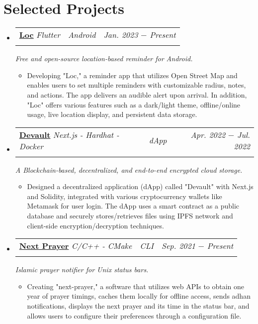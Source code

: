 \documentclass[letterpaper, 11pt]{article}
\makeatletter
\newcommand{\project}[7] {
	\vspace{-1pt}\item[]
  \begin{tabular*}{1\textwidth}[t]{ll@{\extracolsep{\fill}}r}
    #1 \href{#4}{\textbf{\color{RoyalBlue}#2}}
    \textbar{} \textit{\small#5} \textbar{ } & \textit{\footnotesize#7} & \textit{\small #3} \\
    \vspace{-8pt}
  \end{tabular*}
  \textit{\small #6}
  \vspace{-8pt}
}
\newcommand{\subproject}[1] {
\item\small
  {#1}
  \vspace{-2pt}
}
\makeatother
\begin{document}
\section{Selected Projects}
\begin{itemize}[leftmargin=0pt]
  \project
  {\faIcon{bell}}
  {Loc}{Jan. 2023 $-$ Present}
  {https://github.com/AbdeltwabMF/loc/releases/latest}{Flutter}
  {Free and open-source location-based reminder for Android.}{Android}

  \begin{itemize}
    \subproject
    {Developing "Loc," a reminder app that utilizes Open Street Map and enables users to set multiple reminders with customizable radius, notes, and actions. The app delivers an audible alert upon arrival. In addition, "Loc" offers various features such as a dark/light theme, offline/online usage, live location display, and persistent data storage.}
  \end{itemize}\vspace{-4pt}

  \project
  {\faIcon{cloud}}
  {Devault}{Apr. 2022 $-$ Jul. 2022}
  {https://devault.vercel.app/}{Next.js - Hardhat - Docker}
  {A Blockchain-based, decentralized, and end-to-end encrypted cloud storage.}{dApp}

  \begin{itemize}
    \subproject
    {Designed a decentralized application (dApp) called "Devault" with Next.js and Solidity, integrated with various cryptocurrency wallets like Metamask for user login. The dApp uses a smart contract as a public database and securely stores/retrieves files using IPFS network and client-side encryption/decryption techniques.}
  \end{itemize}\vspace{-4pt}

  \project
  {\faIcon{mosque}}
  {Next Prayer}{Sep. 2021 $-$ Present}
  {https://github.com/AbdeltwabMF/next-prayer}{C/C++ - CMake}
  {Islamic prayer notifier for Unix status bars.}{CLI}

  \begin{itemize}
    \subproject
    {Creating "next-prayer," a software that utilizes web APIs to obtain one year of prayer timings, caches them locally for offline access, sends adhan notifications, displays the next prayer and its time in the status bar, and allows users to configure their preferences through a configuration file.}
  \end{itemize}\vspace{-4pt}


\end{itemize}
\end{document}
